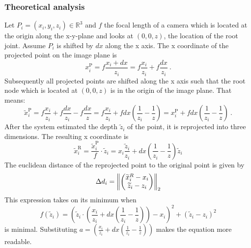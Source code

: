 \subsubsection{Theoretical analysis}
Let $P_i=(x_i, y_i, z_i) \in \mathbb{R}^3$ and $f$ the focal length of a camera which is located at the origin along the x-y-plane and looks at $(0, 0, z)$, the location of the root joint. 
Assume $P_i$ is shifted by $dx$ along the x axis.
The x coordinate of the projected point on the image plane is
\begin{equation}
	x_i^\mathrm{P} = f \frac{x_i + dx}{z_i} = f \frac{x_i}{z_i} + f \frac{dx}{z_i}\ .
\end{equation}
Subsequently all projected points are shifted along the x axis such that the root node which is located at $(0, 0, z)$ is in the origin of the image plane. That means:
\begin{equation}
	\widetilde{x}_i^\mathrm{P} = f \frac{x_i}{z_i} + f \frac{dx}{z_i} - f \frac{dx}{z} 
	= f \frac{x_i}{z_i} + f dx (\frac{1}{z_i} - \frac{1}{z})
	= x_i^\mathrm{P} + f dx (\frac{1}{z_i} - \frac{1}{z})\ .
\end{equation}
After the system estimated the depth $\widetilde{z}_i$ of the point, it is reprojected into three dimensions. The resulting x coordinate is 
\begin{equation}
	\widetilde{x}_i^\mathrm{R} = \frac{\widetilde{x}_i^\mathrm{P}}{f} \cdot \widetilde{z}_i
	= x_i \frac{\widetilde{z}_i}{z_i} + dx (\frac{1}{z_i} - \frac{1}{z}) \widetilde{z}_i
\end{equation}
The euclidean distance of the reprojected point to the original point is given by
\begin{equation}
\label{eq:delta-d}
	\Delta d_i = \norm{ 
	\begin{pmatrix}
		\widetilde{x}_i^R - x_i \\
		\widetilde{z}_i - z_i
	\end{pmatrix}
	}_2
\end{equation}
This expression takes on its minimum when 
\begin{equation}
	\label{eq:minimum-distance}
	f(\widetilde{z}_i) = \left ( \widetilde{z}_i \cdot \left( \frac{x_i}{z_i} + dx \left( \frac{1}{z_i} - \frac{1}{z} \right) \right ) - x_i \right)^2 + ( \widetilde{z}_i - z_i ) ^2
\end{equation}
is minimal. 
Substituting $a = \left( \frac{x_i}{z_i} + dx \left( \frac{1}{z_i} - \frac{1}{z} \right) \right )$ makes the equation more readable. 
